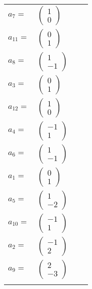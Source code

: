 \documentclass[1p]{elsarticle_modified}
\theoremstyle{definition}
\begin{document}
\begin{tabular}{m{7pt} m{180pt} m{7pt} m{180pt} }
\flushright $a_{7}=$&$\begin{pmatrix}1\\0\end{pmatrix}$ \\
\flushright $a_{11}=$&$\begin{pmatrix}0\\1\end{pmatrix}$ \\
\flushright $a_{8}=$&$\begin{pmatrix}1\\-1\end{pmatrix}$ \\
\flushright $a_{3}=$&$\begin{pmatrix}0\\1\end{pmatrix}$ \\
\flushright $a_{12}=$&$\begin{pmatrix}1\\0\end{pmatrix}$ \\
\flushright $a_{4}=$&$\begin{pmatrix}-1\\1\end{pmatrix}$ \\
\flushright $a_{6}=$&$\begin{pmatrix}1\\-1\end{pmatrix}$ \\
\flushright $a_{1}=$&$\begin{pmatrix}0\\1\end{pmatrix}$ \\
\flushright $a_{5}=$&$\begin{pmatrix}1\\-2\end{pmatrix}$ \\
\flushright $a_{10}=$&$\begin{pmatrix}-1\\1\end{pmatrix}$ \\
\flushright $a_{2}=$&$\begin{pmatrix}-1\\2\end{pmatrix}$ \\
\flushright $a_{9}=$&$\begin{pmatrix}2\\-3\end{pmatrix}$\\&\end{tabular}
\end{document}
